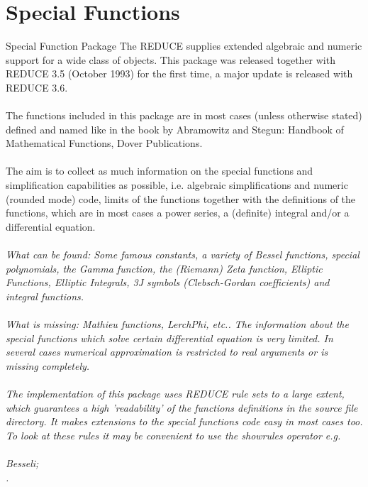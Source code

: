 \section{Special Functions}
\begin{Introduction}{Special Function Package}
The REDUCE  supplies extended
algebraic and numeric support for a wide class of objects.
This package was released together with REDUCE 3.5 (October 1993)
for the first time, a major update is released with REDUCE 3.6.\\
\\

The functions included in this package are in most cases (unless otherwise
stated) defined and named like in the book by Abramowitz and Stegun:
Handbook of Mathematical Functions, Dover Publications.\\
 \\

The aim is to collect as much information on the special functions
and simplification capabilities as possible,
i.e. algebraic simplifications and numeric (rounded mode) code, limits
of the functions together
with the definitions of the functions, which are in most cases a power 
series, a (definite) integral and/or a differential equation.\\
 \\

\em{What can be found:} Some famous constants, a variety of Bessel functions,
special polynomials,
the Gamma function, the (Riemann) Zeta function, Elliptic Functions, Elliptic
Integrals, 3J symbols (Clebsch-Gordan coefficients) and integral functions.\\
 \\

\em{What is missing:} Mathieu functions, LerchPhi, etc..
The information about the special functions which solve certain
differential equation is very limited.
In several cases numerical approximation is restricted to real
arguments or is missing completely.\\
 \\

The implementation of this package uses REDUCE rule sets to a large extent,
which guarantees a high 'readability' of the functions definitions in the
source file directory. It makes extensions to the special
functions code easy in most cases too. To look at these rules
it may be convenient to use the showrules operator e.g.\\
 \\
  Besseli;\\
.\\


\end{Introduction}
